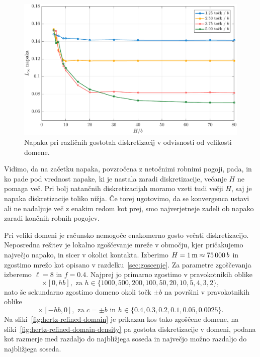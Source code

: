 \documentclass[12pt,a4paper,twoside]{article}
\theoremstyle{definition} %
\theoremstyle{plain} %
\numberwithin{equation}{section}
\newlength{\iw}
\begin{document}
\begin{figure}[!h]
  \centering
  \includegraphics[width=\iw]{images/hertzian_domain_too_small2.pdf}
  \caption[Napaka v odvisnosti od velikosti domene.]{Napaka pri različnih
  gostotah diskretizacij v odvisnosti od velikosti domene.}
  \label{fig:hertz-domain-too-small}
\end{figure}

Vidimo, da na začetku napaka, povzročena z netočnimi robnimi pogoji, pada, in ko pade pod vrednost
napake, ki je nastala zaradi diskretizacije, večanje $H$ ne pomaga več. Pri bolj natančnih
diskretizacijah moramo vzeti tudi večji $H$, saj je napaka diskretizacije toliko nižja. Če torej
ugotovimo, da se konvergenca ustavi ali ne nadaljuje več z enakim redom kot prej, smo najverjetneje
zadeli ob napako zaradi končnih robnih pogojev.

Pri veliki domeni je računsko nemogoče enakomerno gosto večati diskretizacijo. Neposredna rešitev je
lokalno zgoščevanje mreže v območju, kjer pričakujemo največjo napako, in sicer v okolici kontakta.
Izberimo $H = \unit[1]{m} \approx 75\,000\, b$ in zgostimo mrežo kot opisano v
razdelku~\ref{sec:goscenje}. Za parametre zgoščevanja izberemo $\ell = 8$ in $f = 0.4$.
Najprej jo primarno zgostimo v pravokotnikih oblike
\begin{equation}
   [-hb, hb] \times [0, hb], \text{ za } h \in \{1000, 500, 200, 100, 50, 20, 10, 5, 4, 3, 2\},
\end{equation}
nato še sekundarno zgostimo domeno okoli točk $\pm b$ na površini v pravokotnikih oblike
\begin{equation}
  [c-hb, c+hb] \times [-hb, 0], \text{ za } c = \pm b \text{ in } h \in \{0.4, 0.3, 0.2, 0.1, 0.05, 0.0025\}.
\end{equation}
Na sliki~\ref{fig:hertz-refined-domain} je prikazan kos tako zgoščene domene, na
sliki~\ref{fig:hertz-refined-domain-density} pa gostota diskretizacije v domeni, podana kot razmerje
med razdaljo do najbližjega soseda in največjo možno razdaljo do najbližjega soseda.
\end{document}
